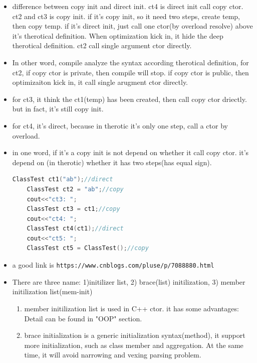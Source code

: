 \documentclass[a4paper,12pt,twoside]{book}
\begin{document}
\begin{itemize}
	\item difference between copy init and direct init. ct4 is direct init call copy ctor. ct2 and ct3 is copy init. if it's copy init, so it need two steps, create temp, then copy temp.  if it's direct init, just call one ctor(by overload resolve)
	above it's therotical definition. When optimization kick in, it hide the deep therotical definition.  ct2 call single argument ctor directly. 
	
	\item In other word, compile analyze the syntax according therotical definition, for ct2, if copy ctor is private, then compile will stop. if copy ctor is public, then optimizaiton kick in, it call single arugment ctor directly. 
	
	\item for ct3, it think the ct1(temp) has been created, then call copy ctor driectly. but in fact, it's still copy init. 
	
	\item for ct4, it's direct, because in therotic it's only one step, call a ctor by overload. 
	
	\item in one word, if it's a copy init is not depend on whether it call copy ctor.  it's depend on (in therotic) whether it has two steps(has equal sign).
	\begin{lstlisting}[frame=single, language=c++]
	ClassTest ct1("ab");//direct
	ClassTest ct2 = "ab";//copy
	cout<<"ct3: ";
	ClassTest ct3 = ct1;//copy
	cout<<"ct4: ";
	ClassTest ct4(ct1);//direct
	cout<<"ct5: ";
	ClassTest ct5 = ClassTest();//copy
	\end{lstlisting}
	
	
	\item a good link is \verb|https://www.cnblogs.com/pluse/p/7088880.html|
	
	\item There are three name: 1)initilizer list, 2) brace(list) initilization, 3) member initilization list(mem-init)
	\begin{enumerate}
		\item member initilization list is used in C++ ctor. it has some advantages: Detail can be found in "OOP" section. 
		
		\item brace initialization is a generic initialization syntax(method), it support more initialization, such as class member and aggregation. At the same time, it will avoid narrowing and vexing parsing problem. 
		

\end{enumerate}
\end{itemize}
\end{document}
